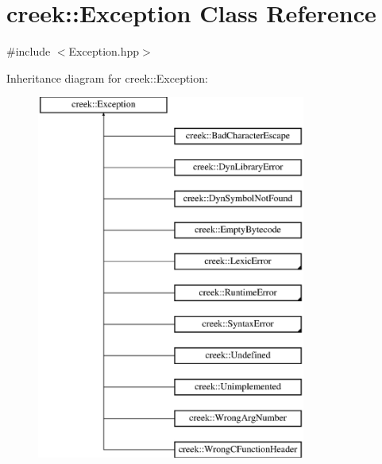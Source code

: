\hypertarget{classcreek_1_1_exception}{}\section{creek\+:\+:Exception Class Reference}
\label{classcreek_1_1_exception}


{\ttfamily \#include $<$Exception.\+hpp$>$}

Inheritance diagram for creek\+:\+:Exception\+:\begin{figure}[H]
\begin{center}
\leavevmode
\includegraphics[height=12.000000cm]{classcreek_1_1_exception}
\end{center}
\end{figure}
